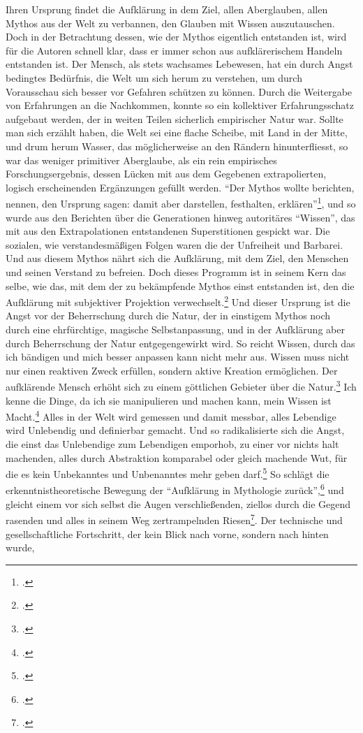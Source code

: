 \documentclass[a4paper, 12pt]{article}
\begin{document}
\begin{onehalfspace}
Ihren Ursprung findet die Aufklärung in dem Ziel, allen Aberglauben, allen Mythos aus der Welt zu verbannen, den Glauben mit Wissen auszutauschen. Doch in der Betrachtung dessen, wie der Mythos eigentlich entstanden ist, wird für die Autoren schnell klar, dass er immer schon aus aufklärerischem Handeln entstanden ist. Der Mensch, als stets wachsames Lebewesen, hat ein durch Angst bedingtes Bedürfnis, die Welt um sich herum zu verstehen, um durch Vorausschau sich besser vor Gefahren schützen zu können. Durch die Weitergabe von Erfahrungen an die Nachkommen, konnte so ein kollektiver Erfahrungsschatz aufgebaut werden, der in weiten Teilen sicherlich empirischer Natur war. Sollte man sich erzählt haben, die Welt sei eine flache Scheibe, mit Land in der Mitte, und drum herum Wasser, das möglicherweise an den Rändern hinunterfliesst, so war das weniger primitiver Aberglaube, als ein rein empirisches Forschungsergebnis, dessen Lücken mit aus dem Gegebenen extrapolierten, logisch erscheinenden Ergänzungen gefüllt werden. "`Der Mythos wollte berichten, nennen, den Ursprung sagen: damit aber darstellen, festhalten, erklären"'\footnote{\Cite[Siehe][S. 14]{dialektik-der-aufklaerung}.}, und so wurde aus den Berichten über die Generationen hinweg autoritäres "`Wissen"', das mit aus den Extrapolationen entstandenen Superstitionen gespickt war. Die sozialen, wie verstandesmäßigen Folgen waren die der Unfreiheit und Barbarei. Und aus diesem Mythos nährt sich die Aufklärung, mit dem Ziel, den Menschen und seinen Verstand zu befreien. Doch dieses Programm ist in seinem Kern das selbe, wie das, mit dem der zu bekämpfende Mythos einst entstanden ist, den die Aufklärung mit subjektiver Projektion verwechselt.\footnote{\Cite[Vgl.][S. 12]{dialektik-der-aufklaerung}.} Und dieser Ursprung ist die Angst vor der Beherrschung durch die Natur, der in einstigem Mythos noch durch eine ehrfürchtige, magische Selbstanpassung, und in der Aufklärung aber durch Beherrschung der Natur entgegengewirkt wird. So reicht Wissen, durch das ich bändigen und mich besser anpassen kann nicht mehr aus. Wissen muss nicht nur einen reaktiven Zweck erfüllen, sondern aktive Kreation ermöglichen. Der aufklärende Mensch erhöht sich zu einem göttlichen Gebieter über die Natur.\footnote{\Cite[Vgl.][S. 15]{dialektik-der-aufklaerung}.} Ich kenne die Dinge, da ich sie manipulieren und machen kann, mein Wissen ist Macht.\footnote{\Cite[Vgl.][S. 15]{dialektik-der-aufklaerung}.} Alles in der Welt wird gemessen und damit messbar, alles Lebendige wird Unlebendig und definierbar gemacht. Und so radikalisierte sich die Angst, die einst das Unlebendige zum Lebendigen emporhob, zu einer vor nichts halt machenden, alles durch Abstraktion komparabel oder gleich machende Wut, für die es kein Unbekanntes und Unbenanntes mehr geben darf.\footnote{\Cite[Vgl.][S. 22 f.]{dialektik-der-aufklaerung}.} So schlägt die erkenntnistheoretische Bewegung der "`Aufklärung in Mythologie zurück"',\footnote{\Cite[Siehe][S. 6]{dialektik-der-aufklaerung}.} und gleicht einem vor sich selbst die Augen verschließenden, ziellos durch die Gegend rasenden und alles in seinem Weg zertrampelnden Riesen\footnote{\Cite[Vgl.][S. 25]{fortschritt}.}. Der technische und gesellschaftliche Fortschritt, der kein Blick nach vorne, sondern nach hinten wurde, 
\end{onehalfspace}
\end{document}
